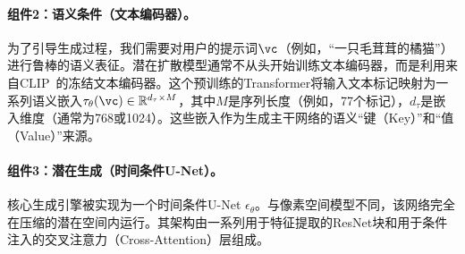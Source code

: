 \documentclass[../../book-main_zh.tex]{subfiles}
\begin{document}
\paragraph{组件2：语义条件（文本编码器）。}
为了引导生成过程，我们需要对用户的提示词$\vc$（例如，“一只毛茸茸的橘猫”）进行鲁棒的语义表征。潜在扩散模型通常不从头开始训练文本编码器，而是利用来自CLIP~\citep{radford2021learning}的冻结文本编码器。这个预训练的Transformer将输入文本标记映射为一系列语义嵌入$\tau_\theta(\vc) \in \mathbb{R}^{d_\tau \times M}$，其中$M$是序列长度（例如，77个标记），$d_\tau$是嵌入维度（通常为768或1024）。这些嵌入作为生成主干网络的语义“键（Key）”和“值（Value）”来源。

\paragraph{组件3：潜在生成（时间条件U-Net）。}
核心生成引擎被实现为一个时间条件U-Net $\epsilon_\theta$。与像素空间模型不同，该网络完全在压缩的潜在空间内运行。其架构由一系列用于特征提取的ResNet块和用于条件注入的交叉注意力（Cross-Attention）层组成。
\end{document}
